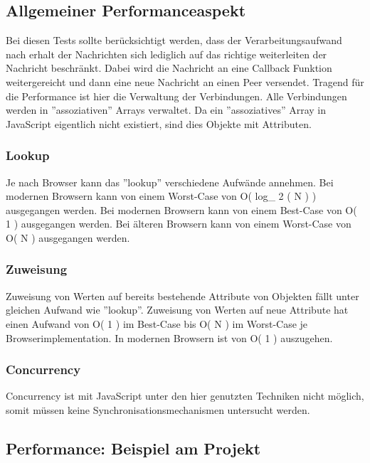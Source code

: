 \subsection{Allgemeiner Performanceaspekt} \label{associativearray}
Bei diesen Tests sollte berücksichtigt werden, dass der Verarbeitungsaufwand nach erhalt der Nachrichten sich lediglich auf das richtige weiterleiten der Nachricht beschränkt. 
Dabei wird die Nachricht an eine Callback Funktion weitergereicht und dann eine neue Nachricht an einen Peer versendet. 
Tragend für die Performance ist hier die Verwaltung der Verbindungen.
Alle Verbindungen werden in ''assoziativen'' Arrays verwaltet. Da ein ''assoziatives'' Array in JavaScript eigentlich nicht existiert, sind dies Objekte mit Attributen. 



\subsubsection{Lookup}
Je nach Browser kann das ''lookup'' verschiedene Aufwände annehmen.
Bei modernen Browsern kann von einem Worst-Case von \mathcal O\left( log_{ 2 }\left( N \right) \right) ausgegangen werden.
Bei modernen Browsern kann von einem Best-Case von \mathcal O\left( 1 \right) ausgegangen werden.
Bei älteren Browsern kann von einem Worst-Case von \mathcal O\left( N \right) ausgegangen werden.



\subsubsection{Zuweisung}
Zuweisung von Werten auf bereits bestehende Attribute von Objekten fällt unter gleichen Aufwand wie ''lookup''.
Zuweisung von Werten auf neue Attribute hat einen Aufwand von \mathcal O\left( 1 \right) im Best-Case bis \mathcal O\left( N \right) im Worst-Case je Browserimplementation. In modernen Browsern ist von \mathcal O\left( 1 \right) auszugehen.



\subsubsection{Concurrency}
Concurrency ist mit JavaScript unter den hier genutzten Techniken nicht möglich, somit müssen keine Synchronisationsmechanismen untersucht werden.




\subsection{Performance: Beispiel am Projekt}

